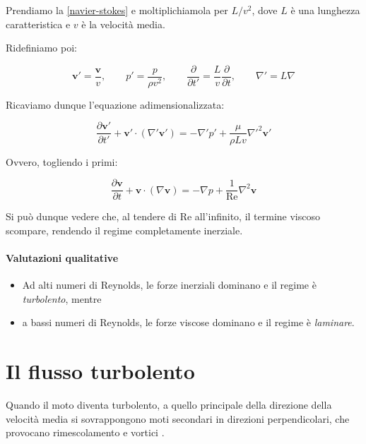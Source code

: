 \documentclass[12pt,a4paper]{article}
\numberwithin{equation}{section}
\begin{document}
Prendiamo la \ref{navier-stokes} e moltiplichiamola per $L/v^2$, dove $L$ è una lunghezza caratteristica e $v$ è la velocità media.

Ridefiniamo poi: 

\begin{equation}
\mathbf{v'} = \frac{\mathbf{v}}{v},\qquad p' = \frac{p}{\rho v^2},\qquad \frac{\partial}{\partial t'} = \frac{L}{v} \frac{\partial}{\partial t},\qquad \nabla' = L \nabla
\end{equation}

Ricaviamo dunque l'equazione adimensionalizzata: 

\begin{equation}
\frac{\partial \mathbf{v'}}{\partial t'} +\mathbf{v'} \cdot (\nabla' \mathbf{v'})  = -\nabla' p' + \frac{\mu}{\rho L v} \nabla'^2 \mathbf{v'}
\end{equation}

Ovvero, togliendo i primi:

\begin{equation}
\frac{\partial \mathbf{v}}{\partial t} +\mathbf{v} \cdot (\nabla \mathbf{v}) = -\nabla p + \frac{1}{\text{Re}} \nabla^2 \mathbf{v}
\end{equation}

Si può dunque vedere che, al tendere di Re all'infinito, il termine viscoso scompare, rendendo il regime completamente inerziale.

\paragraph{Valutazioni qualitative}

\begin{itemize}
\item Ad alti numeri di Reynolds, le forze inerziali dominano e il regime è \emph{turbolento}, mentre
\item a bassi numeri di Reynolds, le forze viscose dominano e il regime è \emph{laminare}.
\end{itemize}

\section{Il flusso turbolento}

Quando il moto diventa turbolento, a quello principale della direzione della velocità media si sovrappongono moti secondari in direzioni perpendicolari, che provocano rimescolamento e vortici \cite{dispense}.
\end{document}
